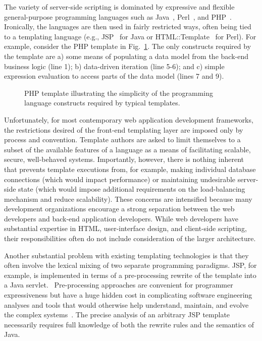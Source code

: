\documentclass{www2003-submission}
\newcommand{\figref}[1]{Fig.~\ref{fig-#1}}
\begin{document}
The variety of server-side scripting is dominated by expressive and
flexible general-purpose programming languages such as
Java~\cite{Java}, Perl~\cite{Perl}, and PHP~\cite{PHP}.  Ironically,
the languages are then used in fairly restricted ways, often being
tied to a templating language (e.g., JSP~\cite{JSP} for Java or
HTML::Template~\cite{HTML-Template} for Perl).  For example, consider
the PHP template in \figref{php-books}.  The only constructs required
by the template are a) some means of populating a data model from the
back-end business logic (line 1); b) data-driven iteration (line
5-6); and c) simple expression evaluation to access parts of the data
model (lines 7 and 9). %

\begin{figure}[htbp]
\caption{PHP template illustrating the simplicity of the programming
language constructs required by typical templates.
\label{fig-php-books}}
\end{figure}

Unfortunately, for most contemporary web application development
frameworks, the restrictions desired of the front-end templating layer
are imposed only by process and convention.  Template authors are
asked to limit themselves to a subset of the available features of a
language as a means of facilitating scalable, secure, well-behaved
systems.  Importantly, however, there is nothing inherent that
prevents template executions from, for example, making individual
database connections (which would impact performance) or maintaining
undesirable server-side state (which would impose additional
requirements on the load-balancing mechanism and reduce scalability).
These concerns are intensified because many development organizations
encourage a strong separation between the web developers and back-end
application developers. While web developers have substantial
expertise in HTML, user-interface design, and client-side scripting,
their responsibilities often do not include consideration of the
larger architecture.

Another substantial problem with existing templating technologies is
that they often involve the lexical mixing of two separate programming
paradigms.  JSP, for example, is implemented in terms of a
pre-processing rewrite of the template into a Java servlet.~\cite{JavaServlet}
Pre-processing approaches are convenient for programmer expressiveness
but have a huge hidden cost in complicating software engineering
analyses and tools that would otherwise help understand, maintain, and
evolve the complex systems~\cite{Badros00-spe,ErnstBadrosNotkin02}\cite[p.~424]{Stroustrup94}.
The precise analysis of an arbitrary JSP template necessarily requires
full knowledge of both the rewrite rules and the semantics of Java.
\end{document}
